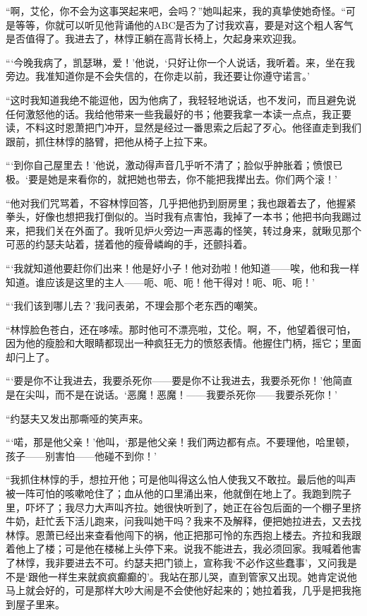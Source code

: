 \par “啊，艾伦，你不会为这事哭起来吧，会吗？”她叫起来，我的真挚使她奇怪。“可是等等，你就可以听见他背诵他的ABC是否为了讨我欢喜，要是对这个粗人客气是否值得了。我进去了，林惇正躺在高背长椅上，欠起身来欢迎我。
\par “‘今晚我病了，凯瑟琳，爱！’他说，‘只好让你一个人说话，我听着。来，坐在我旁边。我准知道你是不会失信的，在你走以前，我还要让你遵守诺言。’
\par “这时我知道我绝不能逗他，因为他病了，我轻轻地说话，也不发问，而且避免说任何激怒他的话。我给他带来一些我最好的书；他要我拿一本读一点点，我正要读，不料这时恩萧把门冲开，显然是经过一番思索之后起了歹心。他径直走到我们跟前，抓住林惇的胳臂，把他从椅子上拉下来。
\par “‘到你自己屋里去！’他说，激动得声音几乎听不清了；脸似乎肿胀着；愤恨已极。‘要是她是来看你的，就把她也带去，你不能把我撵出去。你们两个滚！’
\par “他对我们咒骂着，不容林惇回答，几乎把他扔到厨房里；我也跟着去了，他握紧拳头，好像也想把我打倒似的。当时我有点害怕，我掉了一本书；他把书向我踢过来，把我们关在外面了。我听见炉火旁边一声恶毒的怪笑，转过身来，就瞅见那个可恶的约瑟夫站着，搓着他的瘦骨嶙峋的手，还颤抖着。
\par “‘我就知道他要赶你们出来！他是好小子！他对劲啦！他知道——唉，他和我一样知道。谁应该是这里的主人——呃、呃、呃！他干得对！呃、呃、呃！’
\par “‘我们该到哪儿去？’我问表弟，不理会那个老东西的嘲笑。
\par “林惇脸色苍白，还在哆嗦。那时他可不漂亮啦，艾伦。啊，不，他望着很可怕，因为他的瘦脸和大眼睛都现出一种疯狂无力的愤怒表情。他握住门柄，摇它；里面却闩上了。
\par “‘要是你不让我进去，我要杀死你——要是你不让我进去，我要杀死你！’他简直是在尖叫，而不是在说话。‘恶魔！恶魔！——我要杀死你——我要杀死你！’
\par “约瑟夫又发出那嘶哑的笑声来。
\par “‘喏，那是他父亲！’他叫，‘那是他父亲！我们两边都有点。不要理他，哈里顿，孩子——别害怕——他碰不到你！’
\par “我抓住林惇的手，想拉开他；可是他叫得这么怕人使我又不敢拉。最后他的叫声被一阵可怕的咳嗽呛住了；血从他的口里涌出来，他就倒在地上了。我跑到院子里，吓坏了；我尽力大声叫齐拉。她很快听到了，她正在谷包后面的一个棚子里挤牛奶，赶忙丢下活儿跑来，问我叫她干吗？我来不及解释，便把她拉进去，又去找林惇。恩萧已经出来查看他闯下的祸，他正把那可怜的东西抱上楼去。齐拉和我跟着他上了楼；可是他在楼梯上头停下来。说我不能进去，我必须回家。我喊着他害了林惇，我非要进去不可。约瑟夫把门锁上，宣称我‘不必作这些蠢事’，又问我是不是‘跟他一样生来就疯疯癫癫的’。我站在那儿哭，直到管家又出现。她肯定说他马上就会好的，可是那样大吵大闹是不会使他好起来的；她拉着我，几乎是把我拖到屋子里来。

